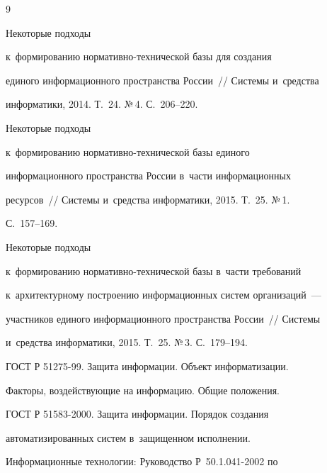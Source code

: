 {\small\frenchspacing

{%


\begin{thebibliography}{9}


      Некоторые подходы 

к~формированию нор\-ма\-тив\-но-тех\-ни\-че\-ской базы для создания 

единого информационного пространства России~/\!\!/ Системы и~средства 

информатики, 2014. Т.~24. №\,4. С.~206--220.


      Некоторые подходы 

к~формированию нор\-ма\-тив\-но-тех\-ни\-че\-ской базы единого 

информационного пространства России в~части информационных 

ресурсов~/\!\!/ Системы и~средства информатики, 2015. Т.~25. №\,1.  

С.~157--169.


      Некоторые подходы 

к~формированию нормативно-технической базы в~части требований 

к~архитектурному построению информационных систем организаций~--- 

участников единого информационного пространства России~/\!\!/ Системы 

и~средства информатики, 2015. Т.~25. №\,3. С.~179--194.


     ГОСТ Р 51275-99. Защита информации. Объект информатизации. 

Факторы, воздействующие на информацию. Общие положения.


     ГОСТ Р 51583-2000. Защита информации. Порядок создания 

автоматизированных систем в~защищенном исполнении. 

     


     Информационные технологии: Руководство Р~50.1.041-2002 по 


\end{thebibliography}}}
